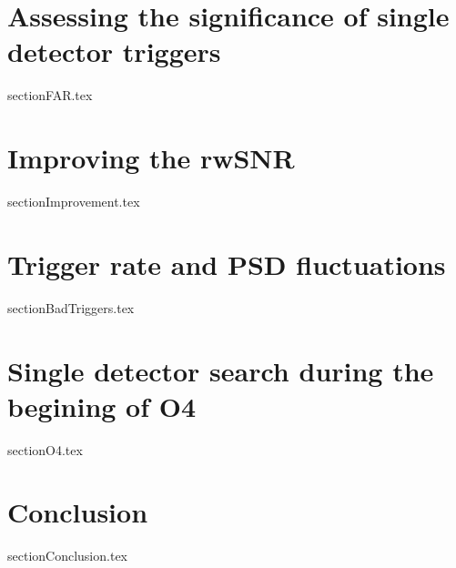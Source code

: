 \documentclass[12pt]{article}
\begin{document}
\section{Assessing the significance of single detector triggers}
\label{section:far}
\secttoc
{sectionFAR.tex}






\clearpage
\newpage
\section{Improving the rwSNR}
\label{section:rwSnr}
\secttoc
{sectionImprovement.tex}



\clearpage
\newpage
\section{Trigger rate and PSD fluctuations}
\label{section:bad_triggers}
\secttoc
{sectionBadTriggers.tex}


\clearpage
\newpage
\section{Single detector search during the begining of O4}
\label{section:O4}
\secttoc
{sectionO4.tex}



\clearpage
\newpage
\section{Conclusion}
\label{section:conclusion}
\secttoc
{sectionConclusion.tex}




\clearpage
\newpage

\printbibliography


\end{document}
